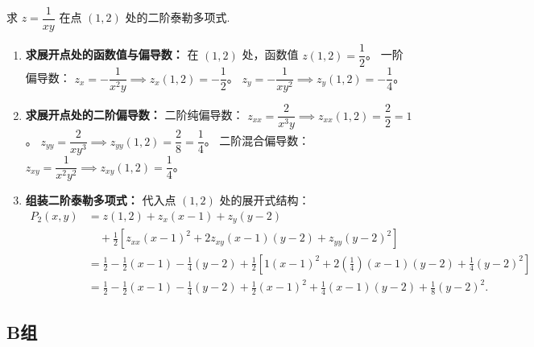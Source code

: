 \documentclass[lang=cn,11pt]{elegantbook}
\begin{document}
\begin{exercise}
求 $z = \dfrac{1}{xy}$ 在点 $(1,2)$ 处的二阶泰勒多项式.
\end{exercise}
\begin{solution}
\begin{enumerate}
  \item \textbf{求展开点处的函数值与偏导数：}
  在 $(1,2)$ 处，函数值 $z(1,2) = \dfrac{1}{2}$。
  一阶偏导数：
  $z_x = -\dfrac{1}{x^2y} \implies z_x(1,2) = -\dfrac{1}{2}$。
  $z_y = -\dfrac{1}{xy^2} \implies z_y(1,2) = -\dfrac{1}{4}$。
  
  \item \textbf{求展开点处的二阶偏导数：}
  二阶纯偏导数：
  $z_{xx} = \dfrac{2}{x^3y} \implies z_{xx}(1,2) = \dfrac{2}{2} = 1$。
  $z_{yy} = \dfrac{2}{xy^3} \implies z_{yy}(1,2) = \dfrac{2}{8} = \dfrac{1}{4}$。
  二阶混合偏导数：
  $z_{xy} = \dfrac{1}{x^2y^2} \implies z_{xy}(1,2) = \dfrac{1}{4}$。
  
  \item \textbf{组装二阶泰勒多项式：}
  代入点 $(1,2)$ 处的展开式结构：
  \begin{align*}
  P_2(x,y) &= z(1,2) + z_x(x-1) + z_y(y-2) \\
  &\quad + \frac{1}{2}\left[ z_{xx}(x-1)^2 + 2z_{xy}(x-1)(y-2) + z_{yy}(y-2)^2 \right] \\
  &= \frac{1}{2} - \frac{1}{2}(x-1) - \frac{1}{4}(y-2) + \frac{1}{2}\left[ 1(x-1)^2 + 2\left(\frac{1}{4}\right)(x-1)(y-2) + \frac{1}{4}(y-2)^2 \right] \\
  &= \frac{1}{2} - \frac{1}{2}(x-1) - \frac{1}{4}(y-2) + \frac{1}{2}(x-1)^2 + \frac{1}{4}(x-1)(y-2) + \frac{1}{8}(y-2)^2.
  \end{align*}
\end{enumerate}
\end{solution}

\subsection{B组}
\end{document}
